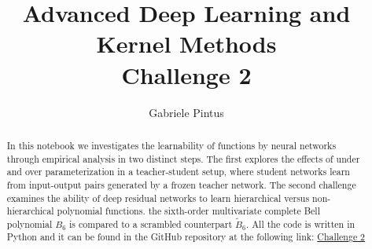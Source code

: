 \title{Advanced Deep Learning and Kernel Methods \\ Challenge 2}

%
% 
\author{Gabriele Pintus}


\begin{abstract}
    In this notebook we  investigates the learnability of functions by neural
    networks through empirical analysis in two distinct steps.  The first explores
    the effects of under and over parameterization in a teacher-student setup, where
    student networks learn from input-output pairs generated by a frozen teacher network.
    The second challenge examines the ability of deep residual networks to learn
    hierarchical versus non-hierarchical polynomial functions. the sixth-order
    multivariate complete Bell polynomial $B_6$ is compared to a scrambled counterpart $\tilde{B}_6$.
    All the code is written in Python and it can be found in the GitHub repository at the following
    link: \href{https://github.com/GabrielePintus/AdvancedDL-KernelMethods/tree/main/Challenges/2}{Challenge 2}
\end{abstract}

\maketitle

